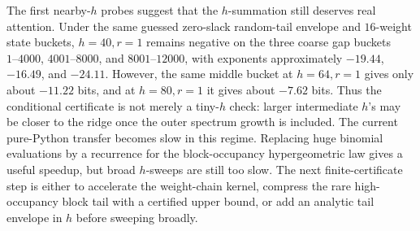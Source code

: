 The first nearby-\(h\) probes suggest that the \(h\)-summation still deserves real attention.  Under the same guessed
zero-slack random-tail envelope and \(16\)-weight state buckets, \(h=40,r=1\) remains negative on the three coarse
gap buckets \(1\text{--}4000\), \(4001\text{--}8000\), and \(8001\text{--}12000\), with exponents approximately
\(-19.44\), \(-16.49\), and \(-24.11\).  However, the same middle bucket at \(h=64,r=1\) gives only about
\(-11.22\) bits, and at \(h=80,r=1\) it gives about \(-7.62\) bits.  Thus the conditional certificate is not merely a
tiny-\(h\) check: larger intermediate \(h\)'s may be closer to the ridge once the outer spectrum growth is included.
The current pure-Python transfer becomes slow in this regime.  Replacing huge binomial evaluations by a recurrence for
the block-occupancy hypergeometric law gives a useful speedup, but broad \(h\)-sweeps are still too slow.  The next
finite-certificate step is either to accelerate the weight-chain kernel, compress the rare high-occupancy block tail
with a certified upper bound, or add an analytic tail envelope in \(h\) before sweeping broadly.

